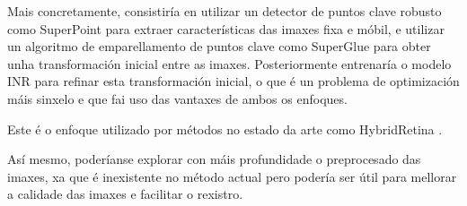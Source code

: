 Mais concretamente, consistiría en utilizar un detector de puntos clave robusto como SuperPoint \cite{superpoint} para extraer características das imaxes fixa e móbil, e utilizar un algoritmo de emparellamento de puntos clave como SuperGlue \cite{superglue} para obter unha transformación inicial entre as imaxes.
Posteriormente entrenaría o modelo INR para refinar esta transformación inicial, o que é un problema de optimización máis sinxelo e que fai uso das vantaxes de ambos os enfoques.

Este é o enfoque utilizado por métodos no estado da arte como HybridRetina \cite{liu2024progressiveretinalimageregistration}. 

Así mesmo, poderíanse explorar con máis profundidade o preprocesado das imaxes, xa que é inexistente no método actual pero podería ser útil para mellorar a calidade das imaxes e facilitar o rexistro.